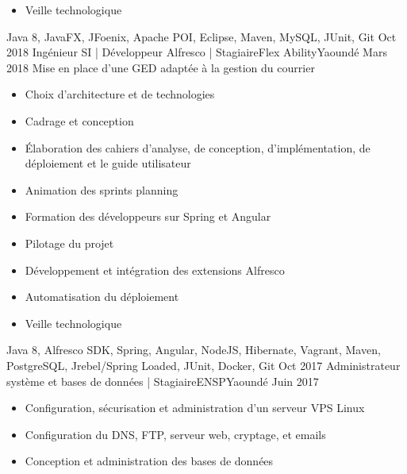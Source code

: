 \begin{experiences}
{\begin{itemize}
                        \item Veille technologique                                                                    
                      \end{itemize}
                    }
                    {Java 8, JavaFX, JFoenix, Apache POI, Eclipse, Maven, MySQL, JUnit, Git}
  \emptySeparator
  \consultantexperience
    {Oct 2018} {Ingénieur SI | Développeur Alfresco | Stagiaire}{Flex Ability}{Yaoundé}
    {Mars 2018}    {Mise en place d'une GED adaptée à la gestion du courrier}{ }
                    {
                      \begin{itemize}
                        \item Choix d'architecture et de technologies
                        \item Cadrage et conception
                        \item Élaboration des cahiers d'analyse, de conception, d'implémentation, de déploiement et le guide utilisateur
                        \item Animation des sprints planning 
                        \item Formation des développeurs sur Spring et Angular
                        \item Pilotage du projet
                        \item Développement et intégration des extensions Alfresco
                        \item Automatisation du déploiement
                        \item Veille technologique                                                                    
                      \end{itemize}
                    }
                {Java 8, Alfresco SDK, Spring, Angular, NodeJS, Hibernate, Vagrant, Maven, PostgreSQL, Jrebel/Spring Loaded, JUnit, Docker, Git}
  \emptySeparator
  \consultantexperience
    {Oct 2017} {Administrateur système et bases de données | Stagiaire}{ENSP}{Yaoundé}
    {Juin 2017}    {}{ }
                    {
                      \begin{itemize}
                        \item Configuration, sécurisation et administration d’un serveur VPS Linux
                        \item Configuration du DNS, FTP, serveur web, cryptage, et emails
                        \item Conception et administration des bases de données

\end{itemize}}
\end{experiences}
